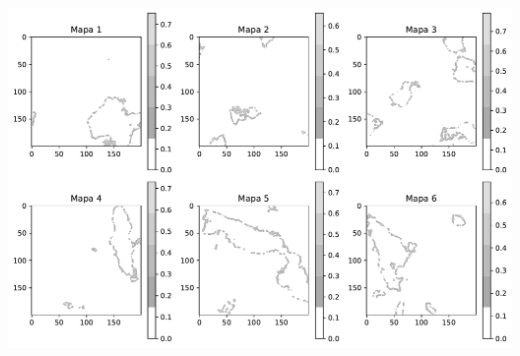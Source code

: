 \documentclass[
  letterpaper,
  DIV=11,
  numbers=noendperiod]{scrartcl}
\begin{document}
\includegraphics{MCA_files/figure-pdf/cell-8-output-6.pdf}
\end{document}
